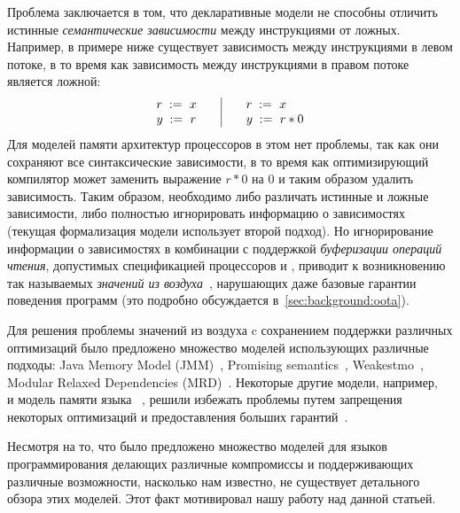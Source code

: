 Проблема заключается в том, что декларативные модели не способны 
отличить истинные \emph{семантические зависимости} между инструкциями от ложных.
Например, в примере ниже существует  зависимость между 
инструкциями в левом потоке, в то время как зависимость между 
инструкциями в правом потоке является ложной:
\[\begin{array}{l@{\qquad}|@{\qquad}l}
\readInst{}{r}{x} & \readInst{}{r}{x} \\
\writeInst{}{y}{r} & \readInst{}{y}{r * 0} \\
\end{array}\]
Для моделей памяти архитектур процессоров в этом нет проблемы, 
так как они сохраняют все синтаксические зависимости, 
в то время как оптимизирующий компилятор может заменить выражение 
$r * 0$ на $0$ и таким образом удалить зависимость. 
Таким образом, необходимо либо различать истинные и ложные зависимости, 
либо полностью игнорировать информацию о зависимостях 
(текущая формализация модели \CPP использует второй подход).
Но игнорирование информации о зависимостях в комбинации с 
поддержкой \emph{буферизации операций чтения}, допустимых 
спецификацией процессоров \ARM и \POWER, 
приводит к возникновению так называемых 
\emph{значений из воздуха}~\cite{Boehm-Demsky:MSPC14}, 
нарушающих даже базовые гарантии  поведения программ
(это подробно обсуждается в~\cref{sec:background:oota}).

Для решения проблемы значений из воздуха c сохранением
поддержки различных оптимизаций было предложено 
множество моделей использующих различные подходы:
Java Memory Model (JMM)~\cite{Manson-al:POPL05}, Promising semantics~\cite{Kang-al:POPL17,Lee-al:PLDI20},
Weakestmo~\cite{Chakraborty-Vafeiadis:POPL19}, Modular Relaxed Dependencies (MRD)~\cite{Paviotti-al:ESOP20}.
Некоторые другие модели, например, \RCMM~\cite{Lahav-al:PLDI17} и модель памяти языка \OCaml~\cite{Dolan-al:PLDI18},
решили избежать проблемы путем запрещения некоторых оптимизаций и предоставления больших гарантий~\cite{Ou-Demsky:OOPSLA18}.

Несмотря на то, что было предложено множество моделей для языков программирования
делающих различные компромиссы и поддерживающих различные возможности, 
насколько нам известно, не существует детального обзора этих моделей. 
Этот факт мотивировал нашу работу над данной статьей.
